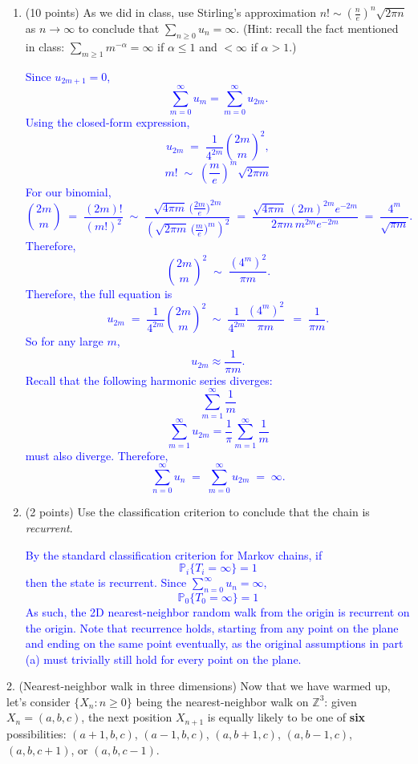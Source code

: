 \documentclass{article}
\begin{document}
\begin{enumerate}[label=(\alph*)]
\item (10 points) As we did in class, use Stirling’s approximation $n! \sim \left(\frac{n}{e}\right)^n \sqrt{2\pi n}$ as $n \to \infty$ to conclude that $\sum_{n \geq 0} u_n = \infty$. (Hint: recall the fact mentioned in class: $\sum_{m \geq 1} m^{-\alpha} = \infty$ if $\alpha \leq 1$ and $< \infty$ if $\alpha > 1$.)

\textcolor{blue}{Since $u_{2m+1} = 0$,
\[
    \sum_{m=0}^{\infty}u_m=\sum_{m=0}^{\infty} u_{2m}.
\]
Using the closed-form expression,
\[
u_{2m} 
\;=\;
\frac{1}{4^{2m}} \binom{2m}{m}^2,
\]
\[
m! \;\sim\; \left(\frac{m}{e}\right)^m \sqrt{2\pi m}
\]
For our binomial,
\[
\binom{2m}{m}
\;=\;
\frac{(2m)!}{(m!)^2}
\;\sim\;
\frac{\sqrt{4\pi m}\,\bigl(\frac{2m}{e}\bigr)^{2m}}{(\sqrt{2\pi m}\,\bigl(\frac{m}{e}\bigr)^{m})^2}
\;=\;
\frac{\sqrt{4\pi m}\,(2m)^{2m} e^{-2m}}{2\pi m \, m^{2m} e^{-2m}}
\;=\;
\frac{4^m}{\sqrt{\pi m}}.
\]
Therefore,
\[
\binom{2m}{m}^2 
\;\sim\;
\frac{(4^m)^2}{\pi m}.
\]
Therefore, the full equation is
\[
u_{2m}
\;=\;
\frac{1}{4^{2m}} \binom{2m}{m}^2
\;\sim\;
\frac{1}{4^{2m}}\frac{(4^m)^2}{\pi m}\,
\;=\;
\frac{1}{\pi m}.
\]
So for any large $m$,
\[
u_{2m} \approx \frac{1}{\pi m}.
\]
Recall that the following harmonic series diverges:
\[
\sum_{m=1}^{\infty} \frac{1}{m}
\]
\[
    \sum_{m=1}^{\infty} u_{2m}=\frac{1}{\pi} \sum_{m=1}^{\infty} \frac{1}{m}
\]
must also diverge. Therefore,
\[
\sum_{n=0}^{\infty} u_n
\;=\;
\sum_{m=0}^{\infty} u_{2m}
\;=\;
\infty.
\]
}

\item (2 points) Use the classification criterion to conclude that the chain is \textit{recurrent}.

\textcolor{blue}{By the standard classification criterion for Markov chains, if 
\[
    \mathbb{P}_i\{T_i = \infty\}=1
\]
then the state is recurrent. 
Since $\sum_{n=0}^{\infty} u_n =
\infty$, $$\mathbb{P}_0\{T_0 = \infty\}=1$$
As such, the 2D nearest-neighbor random walk from the origin is recurrent on the origin. Note that recurrence holds, starting from any point on the plane and ending on the same point eventually, as the original assumptions in part (a) must trivially still hold for every point on the plane. 
}

\end{enumerate}

2. (Nearest-neighbor walk in three dimensions)
Now that we have warmed up, let’s consider $\{X_n : n \geq 0\}$ being the nearest-neighbor walk on $\mathbb{Z}^3$: given $X_n = (a,b,c)$, the next position $X_{n+1}$ is equally likely to be one of \textbf{six} possibilities: $(a+1,b,c)$, $(a-1,b,c)$, $(a,b+1,c)$, $(a,b-1,c)$, $(a,b,c+1)$, or $(a,b,c-1)$.
\end{document}
